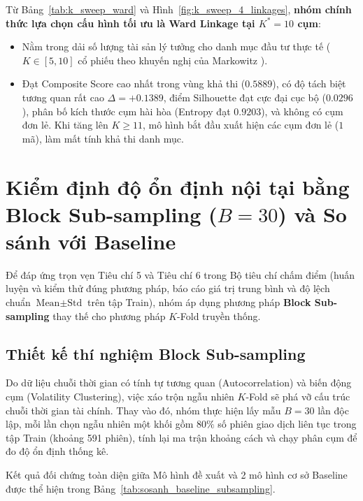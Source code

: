 \documentclass[12pt,a4paper,oneside,openany]{report}
\begin{document}
Từ Bảng~\ref{tab:k_sweep_ward} và Hình~\ref{fig:k_sweep_4_linkages}, \textbf{nhóm chính thức lựa chọn cấu hình tối ưu là Ward Linkage tại $K^* = 10$ cụm}:
\begin{itemize}
  \item Nằm trong dải số lượng tài sản lý tưởng cho danh mục đầu tư thực tế ($K \in [5, 10]$ cổ phiếu theo khuyến nghị của Markowitz \cite{markowitz1952}).
  \item Đạt Composite Score cao nhất trong vùng khả thi ($\mathbf{0.5889}$), có độ tách biệt tương quan rất cao $\Delta = \mathbf{+0.1389}$, điểm Silhouette đạt cực đại cục bộ ($0.0296$), phân bố kích thước cụm hài hòa (Entropy đạt $0.9203$), và không có cụm đơn lẻ. Khi tăng lên $K \ge 11$, mô hình bắt đầu xuất hiện các cụm đơn lẻ ($1$ mã), làm mất tính khả thi danh mục.
\end{itemize}

\section{Kiểm định độ ổn định nội tại bằng Block Sub-sampling ($B=30$) và So sánh với Baseline}
\label{sec:block_subsampling_baseline}

Để đáp ứng trọn vẹn Tiêu chí 5 và Tiêu chí 6 trong Bộ tiêu chí chấm điểm (huấn luyện và kiểm thử đúng phương pháp, báo cáo giá trị trung bình và độ lệch chuẩn $\text{Mean} \pm \text{Std}$ trên tập Train), nhóm áp dụng phương pháp \textbf{Block Sub-sampling} thay thế cho phương pháp $K$-Fold truyền thống.

\subsection{Thiết kế thí nghiệm Block Sub-sampling}
Do dữ liệu chuỗi thời gian có tính tự tương quan (Autocorrelation) và biến động cụm (Volatility Clustering), việc xáo trộn ngẫu nhiên $K$-Fold sẽ phá vỡ cấu trúc chuỗi thời gian tài chính. Thay vào đó, nhóm thực hiện lấy mẫu $B = 30$ lần độc lập, mỗi lần chọn ngẫu nhiên một khối gồm $80\%$ số phiên giao dịch liên tục trong tập Train (khoảng 591 phiên), tính lại ma trận khoảng cách và chạy phân cụm để đo độ ổn định thống kê.

Kết quả đối chứng toàn diện giữa Mô hình đề xuất và 2 mô hình cơ sở Baseline được thể hiện trong Bảng~\ref{tab:sosanh_baseline_subsampling}.
\end{document}
